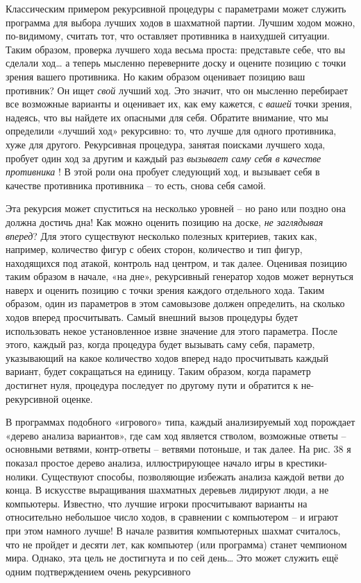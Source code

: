 \documentclass[../main.tex]{subfiles}
\begin{document}
Классическим примером рекурсивной процедуры с параметрами может служить программа для выбора лучших ходов в шахматной партии. Лучшим ходом можно, по-видимому, считать тот, что оставляет противника в наихудшей ситуации. Таким образом, проверка лучшего хода весьма проста: представьте себе, что вы сделали ход\ldots{} а теперь мысленно переверните доску и оцените позицию с точки зрения вашего противника. Но каким образом оценивает позицию ваш противник? Он ищет \emph{свой} лучший ход. Это значит, что он мысленно перебирает все возможные варианты и оценивает их, как ему кажется, с \emph{вашей} точки зрения, надеясь, что вы найдете их опасными для себя. Обратите внимание, что мы определили «лучший ход» рекурсивно: то, что лучше для одного противника, хуже для другого. Рекурсивная процедура, занятая поисками лучшего хода, пробует один ход за другим и каждый раз \emph{вызывает саму себя в качестве противника} ! В этой роли она пробует следующий ход, и вызывает себя в качестве противника противника \--- то есть, снова себя самой.

Эта рекурсия может спуститься на несколько уровней \--- но рано или поздно она должна достичь дна! Как можно оценить позицию на доске, \emph{не заглядывая вперед}? Для этого существуют несколько полезных критериев, таких как, например, количество фигур с обеих сторон, количество и тип фигур, находящихся под атакой, контроль над центром, и так далее. Оценивая позицию таким образом в начале, «на дне», рекурсивный генератор ходов может вернуться наверх и оценить позицию с точки зрения каждого отдельного хода. Таким образом, один из параметров в этом самовызове должен определить, на сколько ходов вперед просчитывать. Самый внешний вызов процедуры будет использовать некое установленное извне значение для этого параметра. После этого, каждый раз, когда процедура будет вызывать саму себя, параметр, указывающий на какое количество ходов вперед надо просчитывать каждый вариант, будет сокращаться на единицу. Таким образом, когда параметр достигнет нуля, процедура последует по другому пути и обратится к не-рекурсивной оценке.

В программах подобного «игрового» типа, каждый анализируемый ход порождает «дерево анализа вариантов», где сам ход является стволом, возможные ответы \--- основными ветвями, контр-ответы \--- ветвями потоньше, и так далее. На рис. 38 я показал простое дерево анализа, иллюстрирующее начало игры в крестики-нолики. Существуют способы, позволяющие избежать анализа каждой ветви до конца. В искусстве выращивания шахматных деревьев лидируют люди, а не компьютеры. Известно, что лучшие игроки просчитывают варианты на относительно небольшое число ходов, в сравнении с компьютером \--- и играют при этом намного лучше! В начале развития компьютерных шахмат считалось, что не пройдет и десяти лет, как компьютер (или программа) станет чемпионом мира. Однако, эта цель не достигнута и по сей день\ldots{} Это может служить ещё одним подтверждением очень рекурсивного
\end{document}
